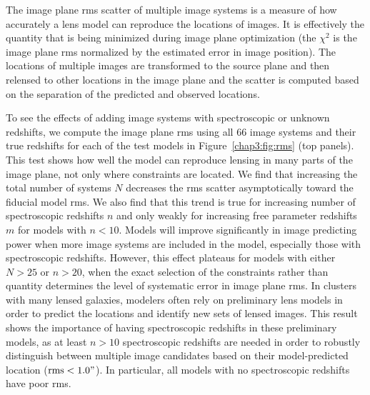 The image plane rms scatter of multiple image systems is a measure of how accurately a lens model can reproduce the locations of images. It is effectively the quantity that is being minimized during image plane optimization (the $\chi^2$ is the image plane rms normalized by the estimated error in image position). The locations of multiple images are transformed to the source plane and then relensed to other locations in the image plane and the scatter is computed based on the separation of the predicted and observed locations.

To see the effects of adding image systems with spectroscopic or unknown redshifts, we compute the image plane rms using all 66 image systems and their true redshifts for each of the test models in Figure~\ref{chap3:fig:rms} (top panels). This test shows how well the model can reproduce lensing in many parts of the image plane, not only where constraints are located. We find that increasing the total number of systems $N$ decreases the rms scatter asymptotically toward the fiducial model rms. We also find that this trend is true for increasing number of spectroscopic redshifts $n$ and only weakly for increasing free parameter redshifts $m$ for models with $n<10$. 
Models will improve significantly in image predicting power when more image systems are included in the model, especially those with spectroscopic redshifts. However, this effect plateaus for models with either $N>25$ or $n>20$, when the exact selection of the constraints rather than quantity determines the level of systematic error in image plane rms. In clusters with many lensed galaxies, modelers often rely on preliminary lens models in order to predict the locations and identify new sets of lensed images. This result shows the importance of having spectroscopic redshifts in these preliminary models, as at least $n>10$ spectroscopic redshifts are needed in order to robustly distinguish between multiple image candidates based on their model-predicted location ($\mathrm{rms}<1.0"$). In particular, all models with no spectroscopic redshifts have poor rms.

